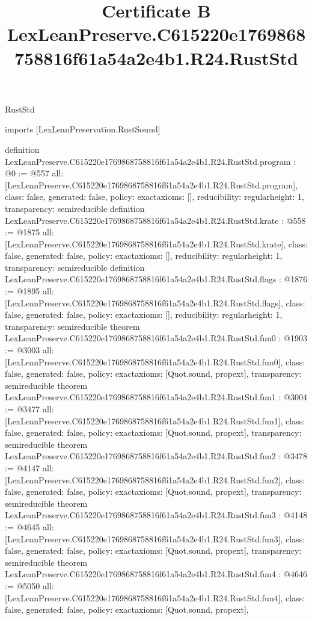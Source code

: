 \begin{lexlean}{RustStd}
\title{Certificate B LexLeanPreserve.C615220e1769868758816f61a54a2e4b1.R24.RustStd}
\begin{coremodule}
imports [LexLeanPreservation.RustSound]

definition LexLeanPreserve.C615220e1769868758816f61a54a2e4b1.R24.RustStd.program : @0 := @557 {
  all: [LexLeanPreserve.C615220e1769868758816f61a54a2e4b1.R24.RustStd.program],
  class: false,
  generated: false,
  policy: exact{axioms: []},
  reducibility: regular{height: 1},
  transparency: semireducible
}
definition LexLeanPreserve.C615220e1769868758816f61a54a2e4b1.R24.RustStd.krate : @558 := @1875 {
  all: [LexLeanPreserve.C615220e1769868758816f61a54a2e4b1.R24.RustStd.krate],
  class: false,
  generated: false,
  policy: exact{axioms: []},
  reducibility: regular{height: 1},
  transparency: semireducible
}
definition LexLeanPreserve.C615220e1769868758816f61a54a2e4b1.R24.RustStd.flags : @1876 := @1895 {
  all: [LexLeanPreserve.C615220e1769868758816f61a54a2e4b1.R24.RustStd.flags],
  class: false,
  generated: false,
  policy: exact{axioms: []},
  reducibility: regular{height: 1},
  transparency: semireducible
}
theorem LexLeanPreserve.C615220e1769868758816f61a54a2e4b1.R24.RustStd.fun0 : @1903 := @3003 {
  all: [LexLeanPreserve.C615220e1769868758816f61a54a2e4b1.R24.RustStd.fun0],
  class: false,
  generated: false,
  policy: exact{axioms: [Quot.sound, propext]},
  transparency: semireducible
}
theorem LexLeanPreserve.C615220e1769868758816f61a54a2e4b1.R24.RustStd.fun1 : @3004 := @3477 {
  all: [LexLeanPreserve.C615220e1769868758816f61a54a2e4b1.R24.RustStd.fun1],
  class: false,
  generated: false,
  policy: exact{axioms: [Quot.sound, propext]},
  transparency: semireducible
}
theorem LexLeanPreserve.C615220e1769868758816f61a54a2e4b1.R24.RustStd.fun2 : @3478 := @4147 {
  all: [LexLeanPreserve.C615220e1769868758816f61a54a2e4b1.R24.RustStd.fun2],
  class: false,
  generated: false,
  policy: exact{axioms: [Quot.sound, propext]},
  transparency: semireducible
}
theorem LexLeanPreserve.C615220e1769868758816f61a54a2e4b1.R24.RustStd.fun3 : @4148 := @4645 {
  all: [LexLeanPreserve.C615220e1769868758816f61a54a2e4b1.R24.RustStd.fun3],
  class: false,
  generated: false,
  policy: exact{axioms: [Quot.sound, propext]},
  transparency: semireducible
}
theorem LexLeanPreserve.C615220e1769868758816f61a54a2e4b1.R24.RustStd.fun4 : @4646 := @5050 {
  all: [LexLeanPreserve.C615220e1769868758816f61a54a2e4b1.R24.RustStd.fun4],
  class: false,
  generated: false,
  policy: exact{axioms: [Quot.sound, propext]},
}
\end{coremodule}
\end{lexlean}
